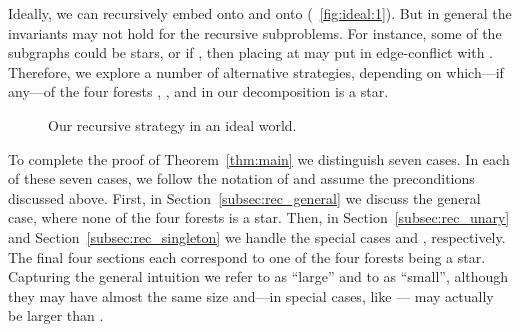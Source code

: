 \documentclass[11pt,a4paper,colorlinks=true,urlcolor=blue,citecolor=red]{article}
\theoremstyle{plain}
\begin{document}
Ideally, we can recursively embed  onto  and  onto
 (\figurename~\ref{fig:ideal:1}).  But in general the
invariants may not hold for the recursive subproblems. For instance,
some of the subgraphs could be stars, or if , then
placing  at  may put  in edge-conflict with
. Therefore, we explore a number of alternative strategies, depending
on which---if any---of the four forests , ,  and
 in our decomposition is a star.
\begin{figure}[htbp]
  \centering {}\hfil
  \hfil
  \caption{Our recursive strategy in an ideal world.\label{fig:ideal}}
\end{figure}


To complete the proof of Theorem~\ref{thm:main} we distinguish seven
cases. In each of these seven cases, we follow the notation of and
assume the preconditions discussed above. First, in
Section~\ref{subsec:rec_general} we discuss the general case, where none
of the four forests is a star. Then, in Section~\ref{subsec:rec_unary}
and Section~\ref{subsec:rec_singleton} we handle the special cases
 and , respectively. The final four sections each
correspond to one of the four forests being a star. Capturing the
general intuition we refer to  as ``large'' and to  as
``small'', although they may have almost the same size and---in special
cases, like --- may actually be larger than .
\end{document}
